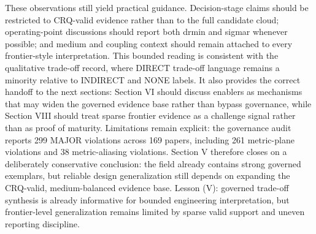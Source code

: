 {}These observations still yield practical guidance. Decision-stage claims should be restricted to CRQ-valid evidence rather than to the full candidate cloud; operating-point discussions should report both drmin and sigma\markdownRendererUnderscore{}r whenever possible; and medium and coupling context should remain attached to every frontier-style interpretation. This bounded reading is consistent with the qualitative trade-off record, where DIRECT trade-off language remains a minority relative to INDIRECT and NONE labels. It also provides the correct handoff to the next sections: Section VI should discuss enablers as mechanisms that may widen the governed evidence base rather than bypass governance, while Section VIII should treat sparse frontier evidence as a challenge signal rather than as proof of maturity. Limitations remain explicit: the governance audit reports 299 MAJOR violations across 169 papers, including 261 metric-plane violations and 38 metric-aliasing violations. Section V therefore closes on a deliberately conservative conclusion: the field already contains strong governed exemplars, but reliable design generalization still depends on expanding the CRQ-valid, medium-balanced evidence base.\markdownRendererParagraphSeparator
{}Lesson (V): governed trade-off synthesis is already informative for bounded engineering interpretation, but frontier-level generalization remains limited by sparse valid support and uneven reporting discipline.\markdownRendererInterblockSeparator
{}
\markdownRendererSectionEnd 
\markdownRendererSectionEnd 
\markdownRendererSectionEnd \markdownRendererSectionBegin
{}\markdownRendererInterblockSeparator
